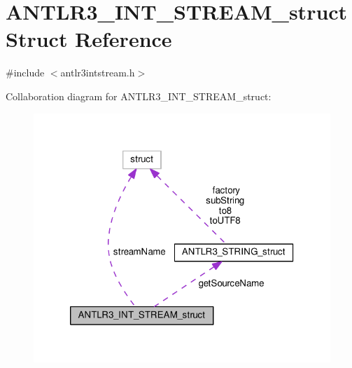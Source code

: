 \hypertarget{struct_a_n_t_l_r3___i_n_t___s_t_r_e_a_m__struct}{\section{A\-N\-T\-L\-R3\-\_\-\-I\-N\-T\-\_\-\-S\-T\-R\-E\-A\-M\-\_\-struct Struct Reference}
\label{struct_a_n_t_l_r3___i_n_t___s_t_r_e_a_m__struct}
}


{\ttfamily \#include $<$antlr3intstream.\-h$>$}



Collaboration diagram for A\-N\-T\-L\-R3\-\_\-\-I\-N\-T\-\_\-\-S\-T\-R\-E\-A\-M\-\_\-struct\-:
\nopagebreak
\begin{figure}[H]
\begin{center}
\leavevmode
\includegraphics[width=320pt]{struct_a_n_t_l_r3___i_n_t___s_t_r_e_a_m__struct__coll__graph}
\end{center}
\end{figure}
